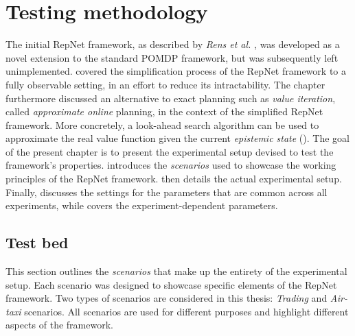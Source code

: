 

\chapter{Testing methodology}
\label{chap:method}

The initial RepNet framework, as described by \textit{Rens et al.} \cite{rensetal}, was developed as a novel extension to the standard POMDP framework, but was subsequently left unimplemented.  covered the simplification process of the RepNet framework to a fully observable setting, in an effort to reduce its intractability. The chapter furthermore discussed an alternative to exact planning such as \textit{value iteration}, called \textit{approximate online} planning, in the context of the simplified RepNet framework. More concretely, a look-ahead search algorithm can be used to approximate the real value function given the current \textit{epistemic state} (). The goal of the present chapter is to present the experimental setup devised to test the framework's properties.  introduces the \textit{scenarios} used to showcase the working principles of the RepNet framework.  then details the actual experimental setup. Finally,  discusses the settings for the parameters that are common across all experiments, while  covers the experiment-dependent parameters.

\section{Test bed}
\label{sec:testbed}
This section outlines the \textit{scenarios} that make up the entirety of the experimental setup. Each scenario was designed to showcase specific elements of the RepNet framework. Two types of scenarios are considered in this thesis: \textit{Trading} and \textit{Air-taxi} scenarios. All scenarios are used for different purposes and highlight different aspects of the framework.

